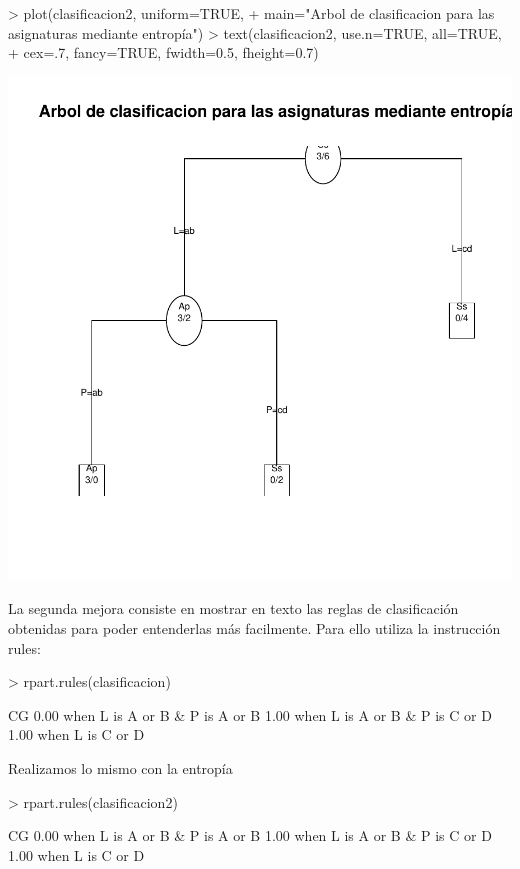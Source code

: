 \documentclass [a4paper] {article}
\begin{document}
\begin{Schunk}
\begin{Sinput}
> plot(clasificacion2, uniform=TRUE, 
+ main="Arbol de clasificacion para las asignaturas mediante entropía")
> text(clasificacion2, use.n=TRUE, all=TRUE, 
+ cex=.7, fancy=TRUE, fwidth=0.5, fheight=0.7)
\end{Sinput}
\end{Schunk}
\includegraphics{Memoria-Figura 4}

La segunda mejora consiste en mostrar en texto las reglas de clasificación obtenidas para poder entenderlas
más facilmente. Para ello utiliza la instrucción rules:

\begin{Schunk}
\begin{Sinput}
> rpart.rules(clasificacion)
\end{Sinput}
\begin{Soutput}
   CG                               
 0.00 when L is A or B & P is A or B
 1.00 when L is A or B & P is C or D
 1.00 when L is C or D              
\end{Soutput}
\end{Schunk}

\newpage
Realizamos lo mismo con la entropía
\begin{Schunk}
\begin{Sinput}
> rpart.rules(clasificacion2)
\end{Sinput}
\begin{Soutput}
   CG                               
 0.00 when L is A or B & P is A or B
 1.00 when L is A or B & P is C or D
 1.00 when L is C or D              
\end{Soutput}
\end{Schunk}
\end{document}
